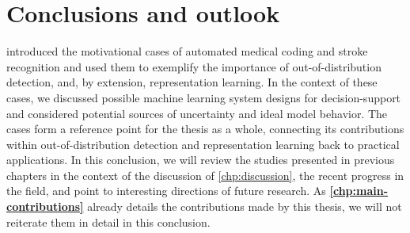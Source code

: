 
\chapter[conclusions and outlook]{Conclusions and outlook}\label{chp:conclusion}

\textbf{} introduced the motivational cases of automated medical coding and stroke recognition and used them to exemplify the importance of out-of-distribution detection, and, by extension, representation learning. In the context of these cases, we discussed possible machine learning system designs for decision-support and considered potential sources of uncertainty and ideal model behavior. 
The cases form a reference point for the thesis as a whole, connecting its contributions within out-of-distribution detection and representation learning back to practical applications. 
In this conclusion, we will review the studies presented in previous chapters in the context of the discussion of \cref{chp:discussion}, the recent progress in the field, and point to interesting directions of future research.
As \textbf{\cref{chp:main-contributions}} already details the contributions made by this thesis, we will not reiterate them in detail in this conclusion. 



